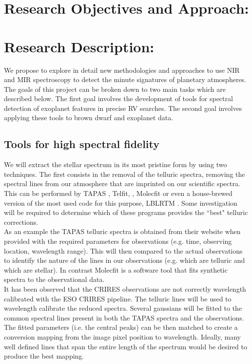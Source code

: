 \documentclass[pdftex,12pt,a4paper]{article}
\begin{document}
\pagebreak
\section{Research Objectives and Approach:}
\section*{Research Description:}
We propose to explore in detail new methodologies and approaches to use NIR and MIR spectroscopy to detect the minute signatures of planetary atmospheres. The goals of this project can be broken down to two main tasks which are described below. The first goal involves the development of tools for spectral detection of exoplanet features in precise {RV} searches. The second goal involves applying these tools to brown dwarf and exoplanet data.\\

\subsection {Tools for high spectral fidelity}

We will extract the stellar spectrum in its most pristine form by using two techniques. The first consists in the removal of the telluric spectra, removing the spectral lines from our atmosphere that are imprinted on our scientific spectra. This can be performed by {TAPAS} \citep{Bertaux2014}, Telfit, \citep{Telfit2014}, Molecfit \citep{Molecfit2015, Kausch2015} or even a house-brewed version of the most used code for this purpose, LBLRTM \citep{LBLRTM2014}. Some investigation will be required to determine which of these programs provides the ``best" telluric corrections.\\

As an example the {TAPAS} telluric spectra is obtained from their website when provided with the required parameters for observations (e.g. time, observing location, wavelength range). This will then compared to the actual observations to identify the nature of the lines in our observations (e.g. which are telluric and which are stellar). In contrast Molecfit is a software tool that fits synthetic spectra to the observational data. \\

It has been observed that the CRIRES observations are not correctly wavelength calibrated with the ESO CRIRES pipeline. The telluric lines will be used to wavelength calibrate the reduced spectra. Several gaussians will be fitted to the common spectral lines present in both the {TAPAS} spectra and the observations. The fitted parameters (i.e. the central peaks) can be then matched to create a conversion mapping from the image pixel position to wavelength. Ideally, many well defined lines that span the entire length of the spectrum would be desired to produce the best mapping.\\
\end{document}
